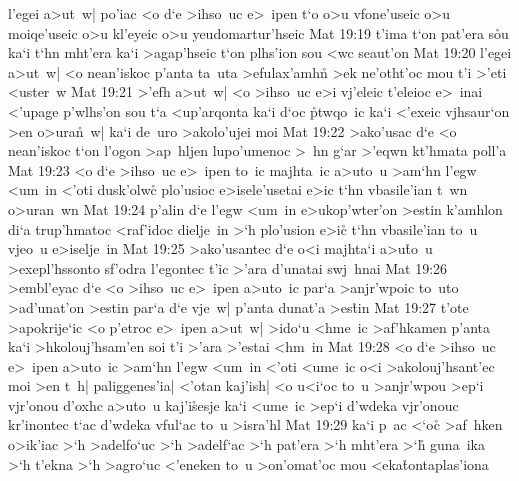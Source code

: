 l'egei
a>ut~w|
po'iac
<o
d`e
>ihso~uc
e>~ipen
t`o
o>u
vfone'useic
o>u
moiqe'useic
o>u
kl'eyeic
o>u
yeudomartur'hseic\bibvsend
\vs Mat 19:19
t'ima
t`on
pat'era
s\r{o}u
ka`i
t`hn
mht'era
ka`i
>agap'hseic
t`on
plhs'ion
sou
<wc
seaut'on\bibvsend
\vs Mat 19:20
l'egei
a>ut~w|
<o
nean'iskoc
p'anta
ta~uta
>efulax'amhn\r{}
>ek
ne'otht'oc
mou
t'i
>'eti
<uster~w\bibvsend
\vs Mat 19:21
>'efh
a>ut~w|
<o
>ihso~uc
e>i
vj'eleic
t'eleioc
e>~inai
<'upage
p'wlhs'on
sou
t`a
<up'arqonta
ka`i
d`oc
\r{p}twqo~ic
ka`i
<'exeic
vjhsaur`on
>en
o>ura\r{n}~w|
ka`i
de~uro
>akolo'ujei
moi\bibvsend
\vs Mat 19:22
>ako'usac
d`e
<o
nean'iskoc
t`on
l'ogon
>ap~hljen
lupo'umenoc
>~hn
g`ar
>'eqwn
kt'hmata
poll'a\bibvsend
\vs Mat 19:23
<o
d`e
>ihso~uc
e>~ipen
to~ic
majhta~ic
a>uto~u
>am`hn
l'egw
<um~in
<'oti
dusk'olwc\r{}
plo'usioc
e>isele'usetai
e>ic
t`hn
vbasile'ian
t~wn
o>uran~wn\bibvsend
\vs Mat 19:24
p'alin
d`e
l'egw
<um~in
e>ukop'wter'on
>estin
k'amhlon
di`a
trup'hmatoc
<raf'idoc
dielje~in
>`h
plo'usion
e>ic\r{}
t`hn
vbasile'ian
to~u
vjeo~u
e>iselje~in\bibvsend
\vs Mat 19:25
>ako'usantec
d`e
o<i
majhta`i
a>u\r{t}o~u
>exepl'hssonto
sf'odra
l'egontec
t'ic
>'ara
d'unatai
swj~hnai\bibvsend
\vs Mat 19:26
>embl'eyac
d`e
<o
>ihso~uc
e>~ipen
a>uto~ic
par`a
>anjr'wpoic
to~uto
>ad'unat'on
>estin
par`a
d`e
vje~w|
p'anta
dunat'a
>es\r{t}in\bibvsend
{}
\vs Mat 19:27
t'ote
>apokrije`ic
<o
p'etroc
e>~ipen
a>ut~w|
>ido`u
<hme~ic
>af'hkamen
p'anta
ka`i
>hkolouj'hsam'en
soi
t'i
>'ara
>'estai
<hm~in\bibvsend
\vs Mat 19:28
<o
d`e
>ihso~uc
e>~ipen
a>uto~ic
>am`hn
l'egw
<um~in
<'oti
<ume~ic
o<i
>akolouj'hsant'ec
moi
>en
t~h|
paliggenes'ia|
<'otan
kaj'ish|
<o
u<i`oc
to~u
>anjr'wpou
>ep`i
vjr'onou
d'oxhc
a>uto~u
kaj'i\r{s}esje
ka`i
<ume~ic
>ep`i
d'wdeka
vjr'onouc
kr'inontec
t`ac
d'wdeka
vful`ac
to~u
>isra'hl\bibvsend
\vs Mat 19:29
ka`i
p~ac
<`o\r{c}
>af~hken
o>ik'iac
>`h
>adelfo`uc
>`h
>adelf`ac
>`h
pat'era
>`h
mht'era
>`h\r{}
guna~ika
>`h
t'ekna
>`h
>agro`uc
<'eneken
to~u
>on'omat'oc
mou
<eka\r{t}ontaplas'iona
